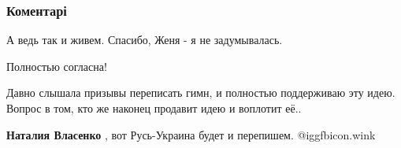  
 
 
 
 
\subsubsection{Коментарі}
\label{sec:06_07_2021.fb.kachan_evgenij.1.gos_gimn_ukraina.cmt}

\begin{itemize}
 
А ведь так и живем. Спасибо, Женя - я не задумывалась.

 
Полностью согласна!

 
Давно слышала призывы переписать гимн, и полностью поддерживаю эту идею. Вопрос в том, кто же наконец продавит идею и воплотит её..

\begin{itemize}
 
\textbf{Наталия Власенко} , вот Русь-Украина будет и перепишем. @igg{fbicon.wink}

 

\end{itemize}
\end{itemize}
